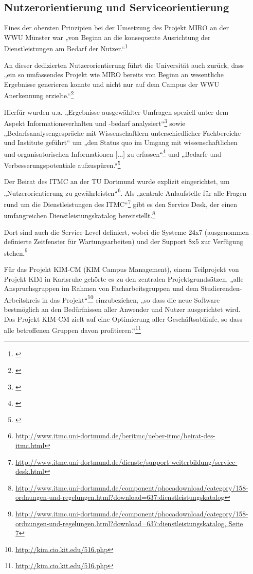 \subsection{Nutzerorientierung und Serviceorientierung}
Eines der obersten Prinzipien bei der Umsetzung des Projekt MIRO an der WWU Münster war „von Beginn an die konsequente Ausrichtung der Dienstleistungen am Bedarf der Nutzer.“\footnote{\cite[19]{vogl_bericht_2013}}

An dieser dedizierten Nutzerorientierung führt die Universität auch zurück, dass „ein so umfassendes Projekt wie MIRO bereits von Beginn an wesentliche Ergebnisse generieren konnte und nicht nur auf dem Campus der WWU Anerkennung erzielte.“\footnote{\cite[19]{vogl_bericht_2013}}

Hierfür wurden u.a. „Ergebnisse ausgewählter Umfragen speziell unter dem Aspekt Informationsverhalten und -bedarf analysiert“\footnote{\cite[19]{vogl_bericht_2013}} sowie „Bedarfsanalysengespräche mit Wissenschaftlern unterschiedlicher Fachbereiche und Institute geführt“ um „den Status quo im Umgang mit wissenschaftlichen und organisatorischen Informationen [...] zu erfassen“\footnote{\cite[19]{vogl_bericht_2013}} und „Bedarfe und Verbesserungspotentiale aufzuspüren.“\footnote{\cite[20]{vogl_bericht_2013}}

Der Beirat des ITMC an der TU Dortmund wurde explizit eingerichtet, um „Nutzerorientierung zu gewährleisten“\footnote{\url{http://www.itmc.uni-dortmund.de/beritmc/ueber-itmc/beirat-des-itmc.html}}. Als „zentrale Anlaufstelle für alle Fragen rund um die Dienstleistungen des ITMC“\footnote{\url{http://www.itmc.uni-dortmund.de/dienste/support-weiterbildung/service-desk.html}} gibt es den Service Desk, der einen umfangreichen Dienstleistungskatalog bereitstellt.\footnote{\url{http://www.itmc.uni-dortmund.de/component/phocadownload/category/158-ordnungen-und-regelungen.html?download=637:dienstleistungskatalog}}

Dort sind auch die Service Level definiert, wobei  die Systeme 24x7 (ausgenommen definierte Zeitfenster für Wartungsarbeiten) und der Support 8x5 zur Verfügung stehen.\footnote{\url{http://www.itmc.uni-dortmund.de/component/phocadownload/category/158-ordnungen-und-regelungen.html?download=637:dienstleistungskatalog, Seite 7}}

Für das Projekt KIM-CM (KIM Campus Management), einem Teilprojekt von Projekt KIM in Karlsruhe gehörte es zu den zentralen Projektgrundsätzen, „alle Anspruchsgruppen im Rahmen von Facharbeitsgruppen und dem Studierenden-Arbeitskreis in das Projekt“\footnote{\url{http://kim.cio.kit.edu/516.php}} einzubeziehen, „so dass die neue Software bestmöglich an den Bedürfnissen aller Anwender und Nutzer ausgerichtet wird. Das Projekt KIM-CM zielt auf eine Optimierung aller Geschäftsabläufe, so dass alle betroffenen Gruppen davon profitieren.“\footnote{\url{http://kim.cio.kit.edu/516.php}}

